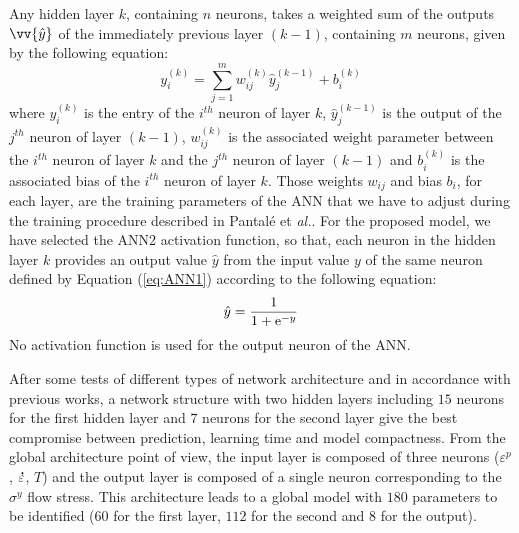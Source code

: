 \documentclass[twoside,english,1p,final,sort&compress]{elsarticle}
\makeatletter
\theoremstyle{plain}
\newcommand{\e}[1]{{\rm e}^{#1}}
\newcommand{\lay}[1]{^{(#1)}}
\newcommand{\mdot}[1]{\accentset{\mbox{\bfseries .}}{#1}}
\newcommand*{\eal}{et \emph{al.}\@\xspace}
\renewcommand{\overrightarrow}{\vv}
\makeatother
\begin{document}
Any hidden layer $k$, containing $n$ neurons, takes a weighted sum of the outputs $\overrightarrow{\hat{y}}$ of the immediately previous layer $(k-1)$, containing $m$ neurons, given by the following equation:
\begin{equation}
y_i\lay{k} = \sum_{j=1}^m w_{ij}\lay{k} \hat{y}_j^{(k-1)}+ b_i\lay{k}\label{eq:ANN1}
\end{equation}
where $y_i\lay{k}$ is the entry of the $i^{th}$ neuron of layer $k$, $\hat{y}_j\lay{k-1}$ is the output of the $j^{th}$ neuron of layer $(k-1)$, $w_{ij}\lay{k}$ is the associated weight parameter between the $i^{th}$ neuron of layer $k$ and the $j^{th}$ neuron of layer $(k-1)$ and $b_i\lay{k}$ is the associated bias of the $i^{th}$ neuron of layer $k$.
Those weights $w_{ij}$ and bias $b_i$, for each layer, are the training parameters of the ANN that we have to adjust during the training procedure described in Pantalé \eal \cite{Pantale-2021}.
For the proposed model, we have selected the ANN2 activation function, so that, each neuron in the hidden layer $k$ provides an output value ${\hat{y}}$ from the input value $y$ of the same neuron defined by Equation (\ref{eq:ANN1}) according to the following equation:
\begin{equation}
\hat{y}=\frac{1}{1 + \e{-y}}\label{eq:ANN2}
\end{equation}
No activation function is used for the output neuron of the ANN.

After some tests of different types of network architecture and in accordance with previous works, a network structure with two hidden layers including $15$ neurons for the first hidden layer and $7$ neurons for the second layer give the best compromise between prediction, learning time and model compactness.
From the global architecture point of view, the input layer is composed of three neurons ($\varepsilon^p$, $\mdot\varepsilon$, $T$) and the output layer is composed of a single neuron corresponding to the $\sigma^y$ flow stress.
This architecture leads to a global model with $180$ parameters to be identified ($60$ for the first layer, $112$ for the second and $8$ for the output).
\end{document}
